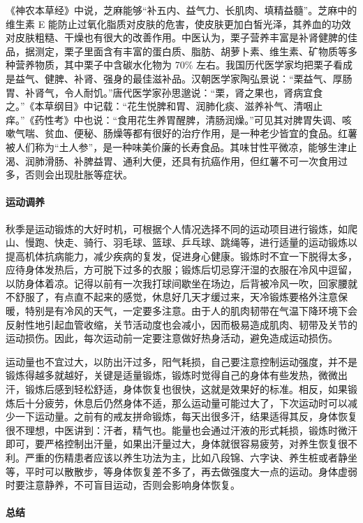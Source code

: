 《神农本草经》中说，芝麻能够“补五内、益气力、长肌肉、填精益髓”。芝麻中的维生素 E 能防止过氧化脂质对皮肤的危害，使皮肤更加白皙光泽，其养血的功效对皮肤粗糙、干燥也有很大的改善作用。中医认为，栗子营养丰富是补肾健脾的佳品，据测定，栗子里面含有丰富的蛋白质、脂肪、胡萝卜素、维生素、矿物质等多种营养物质，其中栗子中含碳水化物为 70\% 左右。我国历代医学家均把栗子看成是益气、健脾、补肾、强身的最佳滋补品。汉朝医学家陶弘景说：“栗益气、厚肠胃、补肾气，令人耐饥。”唐代医学家孙思邈说：“栗，肾之果也，肾病宜食之。”《本草纲目》中记载：“花生悦脾和胃、润肺化痰、滋养补气、清咽止痒。”《药性考》中也说：“食用花生养胃醒脾，清肠润燥。”可见其对脾胃失调、咳嗽气喘、贫血、便秘、肠燥等都有很好的治疗作用，是一种老少皆宜的食品。红薯被人们称为“土人参”，是一种味美价廉的长寿食品。其味甘性平微凉，能够生津止渴、润肺滑肠、补脾益胃、通利大便，还具有抗癌作用，但红薯不可一次食用过多，否则会出现肚胀等症状。

\paragraph{运动调养}

秋季是运动锻炼的大好时机，可根据个人情况选择不同的运动项目进行锻炼，如爬山、慢跑、快走、骑行、羽毛球、篮球、乒乓球、跳绳等，进行适量的运动锻炼以提高机体抗病能力，减少疾病的复发，促进身心健康。锻炼时不宜一下脱得太多，应待身体发热后，方可脱下过多的衣服；锻炼后切忌穿汗湿的衣服在冷风中逗留，以防身体着凉。记得以前有一次我打球间歇坐在场边，后背被冷风一吹，回家腰就不舒服了，有点直不起来的感觉，休息好几天才缓过来，天冷锻炼要格外注意保暖，特别是有冷风的天气，一定要多注意。由于人的肌肉韧带在气温下降环境下会反射性地引起血管收缩，关节活动度也会减小，因而极易造成肌肉、韧带及关节的运动损伤。因此，每次运动前一定要注意做好热身活动，避免造成运动损伤。

运动量也不宜过大，以防出汗过多，阳气耗损，自己要注意控制运动强度，并不是锻炼得越多就越好，关键是适量锻炼，锻炼时觉得自己的身体有些发热，微微出汗，锻炼后感到轻松舒适，身体恢复也很快，这就是效果好的标准。相反，如果锻炼后十分疲劳，休息后仍然身体不适，那么运动量可能过大了，下次运动时可以减少一下运动量。之前有的戒友拼命锻炼，每天出很多汗，结果适得其反，身体恢复很不理想，中医讲到：汗者，精气也。能量也会通过汗液的形式耗损，锻炼时微汗即可，要严格控制出汗量，如果出汗量过大，身体就很容易疲劳，对养生恢复很不利。严重的伤精患者应该以养生功法为主，比如八段锦、六字诀、养生桩或者静坐等，平时可以散散步，等身体恢复差不多了，再去做强度大一点的运动。身体虚弱时要注意静养，不可盲目运动，否则会影响身体恢复。

\paragraph{总结}

